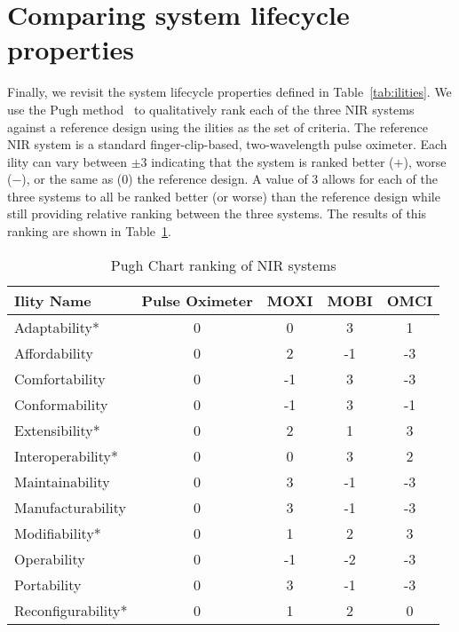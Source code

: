 \section{Comparing system lifecycle properties}
Finally, we revisit the system lifecycle properties defined in Table~\ref{tab:ilities}. We use the Pugh method~\cite{Pugh1981} to qualitatively rank each of the three \ac{NIR} systems against a reference design using the ilities as the set of criteria. The reference \ac{NIR} system is a standard finger-clip-based, two-wavelength pulse oximeter. Each ility can vary between $\pm3$ indicating that the system is ranked better ($+$), worse ($-$), or the same as ($0$) the reference design. A value of 3 allows for each of the three systems to all be ranked better (or worse) than the reference design while still providing relative ranking between the three systems. The results of this ranking are shown in Table~\ref{tab:pughtable}. 

\begin{table}
\centering
\caption{Pugh Chart ranking of NIR systems}
\label{tab:pughtable}
\begin{tabular}{@{}lcccc@{}}
\toprule
Ility Name        & Pulse Oximeter & MOXI & MOBI & OMCI \\ \midrule
Adaptability*     & 0              & 0    & 3    & 1    \\
Affordability     & 0              & 2    & -1   & -3   \\
Comfortability    & 0              & -1   & 3    & -3   \\
Conformability    & 0              & -1   & 3    & -1   \\
Extensibility*    & 0              & 2    & 1    & 3    \\
Interoperability* & 0              & 0    & 3    & 2    \\
Maintainability   & 0              & 3    & -1   & -3   \\
Manufacturability & 0              & 3    & -1   & -3   \\
Modifiability*    & 0              & 1    & 2    & 3    \\
Operability       & 0              & -1   & -2   & -3   \\
Portability       & 0              & 3    & -1   & -3   \\
Reconfigurability*& 0              & 1    & 2    & 0    \\ \bottomrule
\end{tabular}%
\end{table}

